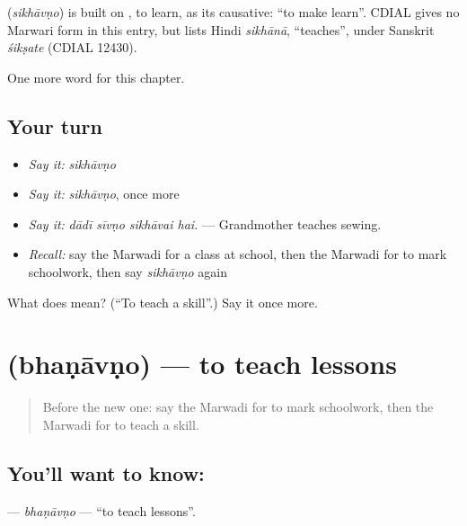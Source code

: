 \begin{cousinweb}
\textbf{} (\emph{sikhāvṇo}) is built on \textbf{}, to learn, as its causative: \textquotedblleft{}to make learn\textquotedblright{}. CDIAL gives no Marwari form in this entry, but lists Hindi \emph{sikhānā}, \textquotedblleft{}teaches\textquotedblright{}, under Sanskrit \emph{śikṣate} (CDIAL 12430).
\end{cousinweb}

\begin{grammarlens}[title={What you've built}]
One more word for this chapter.
\end{grammarlens}

\subsection*{Your turn}
\begin{itemize}
\raggedright
  \item \emph{Say it:} \emph{sikhāvṇo}
  \item \emph{Say it:} \emph{sikhāvṇo}, once more
  \item \emph{Say it:} \emph{dādī sīvṇo sikhāvai hai.} — Grandmother teaches sewing.
  \item \emph{Recall:} say the Marwadi for a class at school, then the Marwadi for to mark schoolwork, then say \emph{sikhāvṇo} again
\end{itemize}

\begin{tcolorbox}[breakable,colback=teal!4,colframe=teal!35!black,title={Before you move on}]
What does  mean? (\textquotedblleft{}To teach a skill\textquotedblright{}.) Say it once more.
\end{tcolorbox}
\section[\texorpdfstring{\mw{भणावणो} (bhaṇāvṇo)}{भणावणो (bhaṇāvṇo)}]{ (bhaṇāvṇo) — to teach lessons}

\label{lesson:MW-C287-bhanavno}



\begin{quote}
Before the new one: say the Marwadi for to mark schoolwork, then the Marwadi for to teach a skill.
\end{quote}

\subsection*{You'll want to know: }
\textbf{} — \emph{bhaṇāvṇo} — \textquotedblleft{}to teach lessons\textquotedblright{}.

